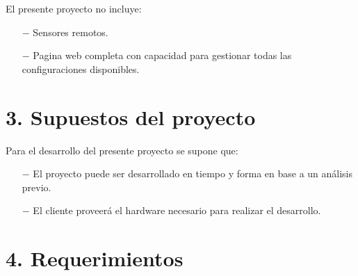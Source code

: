 \documentclass[11pt]{charter}
\begin{document}
El presente proyecto no incluye:
\begin{itemize}
\item[$-$] Sensores remotos.
\item[$-$] Pagina web completa con capacidad para gestionar todas las configuraciones disponibles.
\end{itemize}

\section{3. Supuestos del proyecto}
\label{sec:supuestos}



Para el desarrollo del presente proyecto se supone que:
\begin{itemize}
\item[$-$] El proyecto puede ser desarrollado en tiempo y forma en base a un análisis previo.
\item[$-$] El cliente proveerá el hardware necesario para realizar el desarrollo.
\end{itemize}

\clearpage

\section{4. Requerimientos}
\label{sec:requerimientos}

\end{document}
